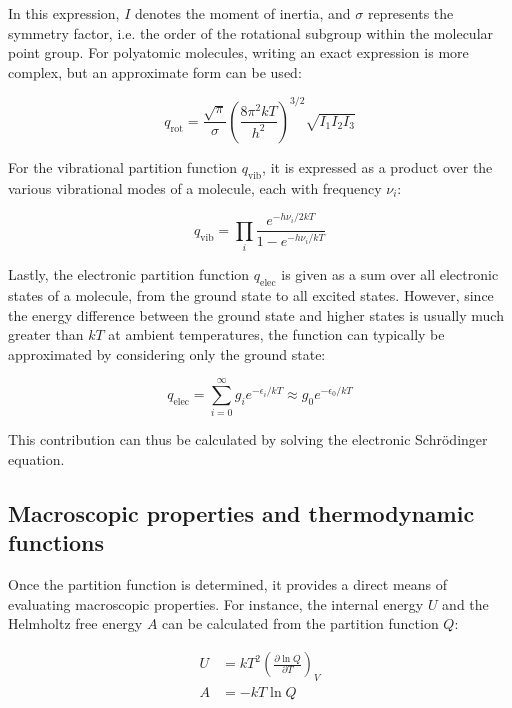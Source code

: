 In this expression, $I$ denotes the moment of inertia, and $\sigma$ represents the symmetry factor, i.e. the order of the rotational subgroup within the molecular point group. For polyatomic molecules, writing an exact expression is more complex, but an approximate form can be used:

\begin{equation}
    q_{\text{rot}} = \frac{\sqrt{\pi}}{\sigma}\left(\frac{8\pi^2kT}{h^2}\right)^{3/2} \sqrt{I_1I_2I_3}
\end{equation}

For the vibrational partition function $q_\text{vib}$, it is expressed as a product over the various vibrational modes of a molecule, each with frequency $\nu_i$:

\begin{equation}
    q_{\text{vib}} = \prod_{i} \frac{e^{-h\nu_i/2kT}}{1-e^{-h\nu_i/kT}}
\end{equation}

Lastly, the electronic partition function $q_\text{elec}$ is given as a sum over all electronic states of a molecule, from the ground state to all excited states. However, since the energy difference between the ground state and higher states is usually much greater than $kT$ at ambient temperatures, the function can typically be approximated by considering only the ground state:

\begin{equation}
    q_{\text{elec}} = \sum_{i=0}^{\infty} g_i e^{-\epsilon_i/kT} \approx g_0 e^{-\epsilon_0/kT}
\end{equation}

This contribution can thus be calculated by solving the electronic Schr\"odinger equation. 



\subsection{Macroscopic properties and thermodynamic functions}

Once the partition function is determined, it provides a direct means of evaluating macroscopic properties. For instance, the internal energy $U$ and the Helmholtz free energy $A$ can be calculated from the partition function $Q$:

\begin{align}
    U &= kT^2 \left(\frac{\partial \ln Q}{\partial T}\right)_V \\
    A &= -kT\ln Q
\end{align}

